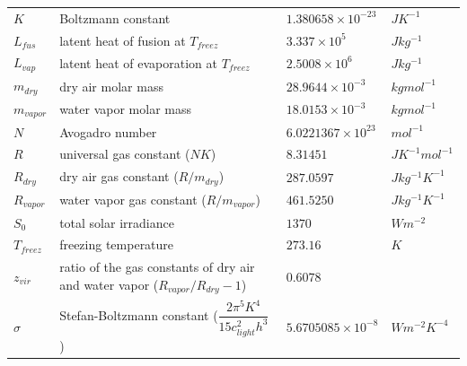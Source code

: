 \documentclass[letterpaper,titlepage,10pt]{article}
\numberwithin{equation}{section}
\begin{document}
\begin{appendices}
\begin{tabular}{p{}p{}p{}p{}}
	$K$                & Boltzmann constant                                                                   & $1.380658 \times 10^{-23}$ & $J K^{-1}$ \\
	$L_{fus}$          & latent heat of fusion at $T_{freez}$                                                 & $3.337 \times 10^5$        & $J kg^{-1}$ \\
	$L_{vap}$          & latent heat of evaporation at $T_{freez}$                                            & $2.5008 \times 10^6$       & $J kg^{-1}$ \\
	$m_{dry}$          & dry air molar mass                                                                   & $28.9644 \times 10^{-3}$   & $kg mol^{-1}$ \\
	$m_{vapor}$        & water vapor molar mass                                                               & $18.0153 \times 10^{-3}$   & $kg mol^{-1}$ \\
	$N$                & Avogadro number                                                                      & $6.0221367 \times 10^{23}$ & $mol^{-1}$ \\
	$R$                & universal gas constant ($N K$)                                                       & $8.31451$                  & $J K^{-1} mol^{-1}$ \\
	$R_{dry}$          & dry air gas constant ($R / m_{dry}$)                                                 & $287.0597$                 & $J kg^{-1} K^{-1}$ \\
	$R_{vapor}$        & water vapor gas constant ($R / m_{vapor}$)                                           & $461.5250$                 & $J kg^{-1} K^{-1}$ \\
	$S_0$              & total solar irradiance                                                               & $1370$                     & $W m^{-2}$ \\
	$T_{freez}$        & freezing temperature                                                                 & $273.16$                   & $K$ \\
	$z_{vir}$          & ratio of the gas constants of dry air and water vapor ($R_{vapor} / R_{dry} - 1$)    & $0.6078$                   & \\
	$\sigma$           & Stefan-Boltzmann constant ($\dfrac{2 \pi^5 K^4}{15 c_{light}^2 h^3}$)                & $5.6705085 \times 10^{-8}$ & $W m^{-2} K^{-4}$ \\
	\hline
\end{tabular}


\end{appendices}
\end{document}
